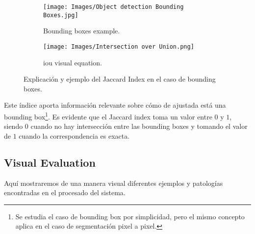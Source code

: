 \begin{figure}[ht]
  \begin{subfigure}[t]{.45\textwidth}
    \centering
    \caption{Bounding boxes example.}
    \texttt{[image: Images/Object detection Bounding Boxes.jpg]}
  \end{subfigure}\hfill
  \begin{subfigure}[t]{.45\textwidth}
    \centering
    \caption{\gls{iou} visual equation.}
    \texttt{[image: Images/Intersection over Union.png]}
  \end{subfigure}
  \caption[Explicación del Jaccard Index]{Explicación y ejemplo del Jaccard
    Index en el caso de bounding boxes.}
\end{figure}

Este índice aporta información relevante sobre cómo de ajustada está una
bounding box\footnote{Se estudia el caso de bounding box por simplicidad, pero
  el mismo concepto aplica en el caso de segmentación pixel a pixel.}. Es
evidente que el Jaccard index toma un valor entre \(0\) y \(1\), siendo \(0\)
cuando no hay intersección entre las bounding boxes y tomando el valor de \(1\)
cuando la correspondencia es exacta.

\subsection{Visual Evaluation}

Aquí mostraremos de una manera visual diferentes ejemplos y patologías
encontradas en el procesado del sistema.
